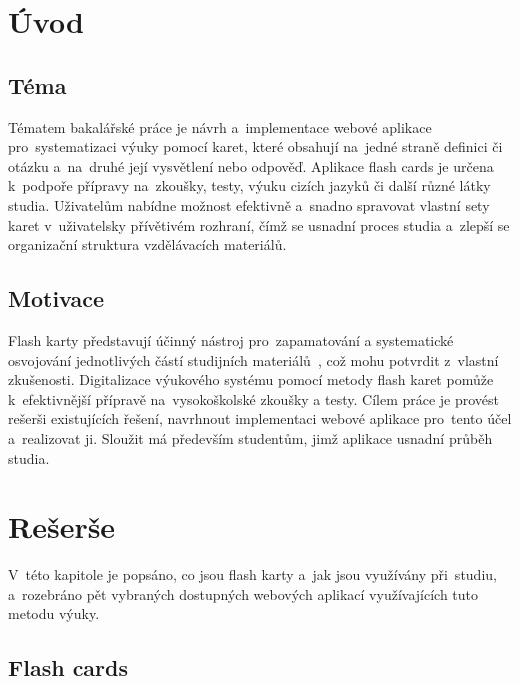 \documentclass[twoside]{ctuthesis}
\begin{document}
\maketitle


\chapter{Úvod}

\section{Téma}

Tématem bakalářské práce je návrh a~implementace webové aplikace pro~systematizaci výuky pomocí karet, které obsahují na~jedné straně definici či otázku a~na~druhé její vysvětlení nebo odpověď. Aplikace flash cards je určena k~podpoře přípravy na~zkoušky, testy, výuku cizích jazyků či další různé látky studia. Uživatelům nabídne možnost efektivně a~snadno spravovat vlastní sety karet v~uživatelsky přívětivém rozhraní, čímž se usnadní proces studia a~zlepší se organizační struktura vzdělávacích materiálů.

\section{Motivace}

Flash karty představují účinný nástroj pro~zapamatování a systematické osvojování jednotlivých částí studijních materiálů~\cite{maine}, což mohu potvrdit z~vlastní zkušenosti. Digitalizace výukového systému pomocí metody flash karet pomůže k~efektivnější přípravě na~vysokoškolské zkoušky a testy. Cílem práce je provést rešerši existujících řešení, navrhnout implementaci webové aplikace pro~tento účel a~realizovat ji. Sloužit má především studentům, jimž aplikace usnadní průběh studia.

\chapter{Rešerše}

V~této kapitole je popsáno, co jsou flash karty a~jak jsou využívány při~studiu, a~rozebráno pět vybraných dostupných webových aplikací využívajících tuto metodu výuky.

\section{Flash cards}
\end{document}
